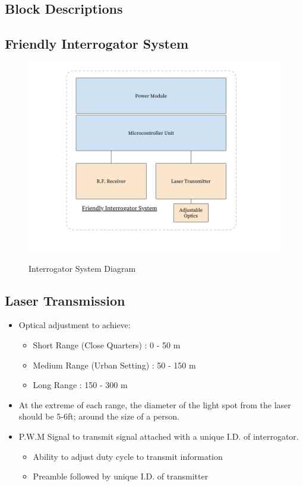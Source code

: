 \documentclass[openbib,letterpaper,10pt]{article}
\begin{document}
\begin{spacing}{1.15}
\subsection{Block Descriptions}
\subsection*{Friendly Interrogator System}
\begin{figure} [H]
	\centering
	\includegraphics[scale=0.35]{Interrogator_Diagram.png}
	\label{fig:system-diagram}
	\vspace{-10mm}
	\caption{Interrogator System Diagram}
\end{figure}

\subsection*{{\normalsize Laser Transmission}}
\begin{itemize}
	\item Optical adjustment to achieve:
	\begin{itemize}
		\item Short Range (Close Quarters) : 0 - 50 m
		\item Medium Range (Urban Setting) : 50 - 150 m
		\item Long Range : 150 - 300 m
	\end{itemize}
	\item At the extreme of each range, the diameter of the light spot from the laser should be 5-6ft; around the size of a person. 
	\item P.W.M Signal to transmit signal attached with a unique I.D. of interrogator.
		\begin{itemize}
			\item Ability to adjust duty cycle to transmit information 
			\item Preamble followed by unique I.D. of transmitter
		\end{itemize}
\end{itemize}


\end{spacing}
\end{document}
